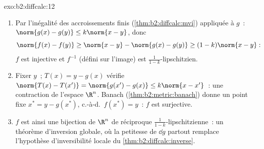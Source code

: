 \begin{solution}{exo:b2:diffcalc:12}
\begin{enumerate}
  \item Par l'inégalité des accroissements finis
        (\cref{thm:b2:diffcalc:mvi}) appliquée à $g$~:
        $\norm{g(x) - g(y)} \leq k\norm{x-y}$, donc
        \[
        \norm{f(x) - f(y)} \geq \norm{x - y} - \norm{g(x) -
        g(y)} \geq (1 - k)\norm{x - y} :
        \]
        $f$ est injective et $f^{-1}$ (défini sur l'image) est
        $\frac{1}{1-k}$-lipschitzien.
  \item Fixer $y$~; $T(x) = y - g(x)$ vérifie $\norm{T(x) -
        T(x')} = \norm{g(x') - g(x)} \leq k\norm{x - x'}$~: une
        contraction de l'espace  $\R^n$. Banach
        (\cref{thm:b2:metric:banach}) donne un point fixe $x^*
        = y - g(x^*)$, c.-à-d.\ $f(x^*) = y$~: $f$ est surjective.
  \item $f$ est ainsi une bijection de $\R^n$ de réciproque
        $\frac{1}{1-k}$-lipschitzienne~: un théorème d'inversion
        globale, où la petitesse de $\dd g$ partout remplace
        l'hypothèse d'inversibilité locale du
        \cref{thm:b2:diffcalc:inverse}.
\end{enumerate}
\end{solution}

